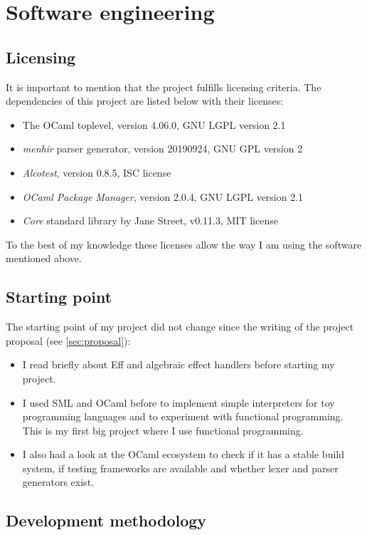 \documentclass[class=article, crop=false]{standalone}
\begin{document}
\section{Software engineering}

\subsection{Licensing}

It is important to mention that the project fulfills licensing criteria. The
dependencies of this project are listed below with their licenses:
\begin{itemize}
\item The OCaml toplevel, version 4.06.0, GNU LGPL version 2.1
\item \emph{menhir} parser generator, version 20190924, GNU GPL version 2
\item \emph{Alcotest}, version 0.8.5, ISC license
\item \emph{OCaml Package Manager}, version 2.0.4, GNU LGPL version 2.1
\item \emph{Core} standard library by Jane Street, v0.11.3, MIT license
\end{itemize}
To the best of my knowledge these licenses allow the way I am using the software
mentioned above.

\subsection{Starting point}

The starting point of my project did not change since the writing of the
project proposal (see \autoref{sec:proposal}):
\begin{itemize}
  \item I read briefly about Eff and algebraic effect handlers before starting
  my project.
  \item I used SML and OCaml before to implement simple interpreters for toy
  programming languages and to experiment with functional programming. This is
  my first big project where I use functional programming.
  \item I also had a look at the OCaml ecosystem to check if it has a stable
  build system, if testing frameworks are available and whether lexer and parser
  generators exist.
\end{itemize}

\subsection{Development methodology}
\end{document}
